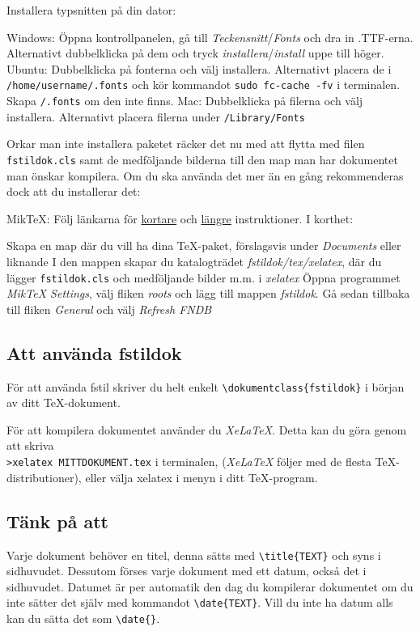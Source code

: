 \documentclass{fstildok}
\newcommand{\bs}{\textbackslash}
\begin{document}
Installera typsnitten på din dator:
\begin{punkter}
\tompunkt Windows: Öppna kontrollpanelen, gå till \textit{Teckensnitt}/\textit{Fonts} och dra in .TTF-erna. Alternativt dubbelklicka på dem och tryck \textit{installera}/\textit{install} uppe till höger.
\tompunkt Ubuntu: Dubbelklicka på fonterna och välj installera. Alternativt placera de i \texttt{/home/username/.fonts} och kör kommandot \texttt{sudo fc-cache -fv} i terminalen. Skapa \texttt{/.fonts} om den inte finns.
\tompunkt Mac: Dubbelklicka på filerna och välj installera. Alternativt placera filerna under \texttt{/Library/Fonts}
\end{punkter}


Orkar man inte installera paketet räcker det nu med att flytta med filen \texttt{fstildok.cls} samt de medföljande bilderna till den map man har dokumentet man önskar kompilera. Om du ska använda det mer än en gång rekommenderas dock att du installerar det:
\begin{punkter}
\tompunkt MikTeX: Följ länkarna för \href{http://docs.miktex.org/faq/maintenance.html#styfiles}{kortare} och \href{http://docs.miktex.org/manual/localadditions.html}{längre} instruktioner. I korthet: 
\begin{punkter}
\punkt Skapa en map där du vill ha dina \TeX-paket, förslagsvis under \textit{Documents} eller liknande
\punkt I den mappen skapar du katalogträdet \textit{fstildok/tex/xelatex}, där du lägger \texttt{fstildok.cls} och medföljande bilder m.m. i \textit{xelatex}
\punkt Öppna programmet  \textit{MikTeX Settings}, välj fliken \textit{roots} och lägg till mappen \textit{fstildok}. Gå sedan tillbaka till fliken \textit{General} och välj \textit{Refresh FNDB}
\end{punkter}
\end{punkter}

\subsection{Att använda fstildok}
För att använda fstil skriver du helt enkelt \texttt{\bs dokumentclass\{fstildok\}} i början av ditt \TeX-dokument.

För att kompilera dokumentet använder du \textit{XeLaTeX}. Detta kan du göra genom att skriva \\ \texttt{>xelatex MITTDOKUMENT.tex} i terminalen, (\textit{XeLaTeX} följer med de flesta \TeX-distributioner), eller välja xelatex i menyn i ditt \TeX-program.

\subsection{Tänk på att}
Varje dokument behöver en titel, denna sätts med \texttt{\bs title\{TEXT\}} och syns i sidhuvudet. Dessutom förses varje dokument med ett datum, också det i sidhuvudet. Datumet är per automatik den dag du kompilerar dokumentet om du inte sätter det själv med kommandot \texttt{\bs date\{TEXT\}}. Vill du inte ha datum alls kan du sätta det som \texttt{\bs date\{\}}.
\end{document}
